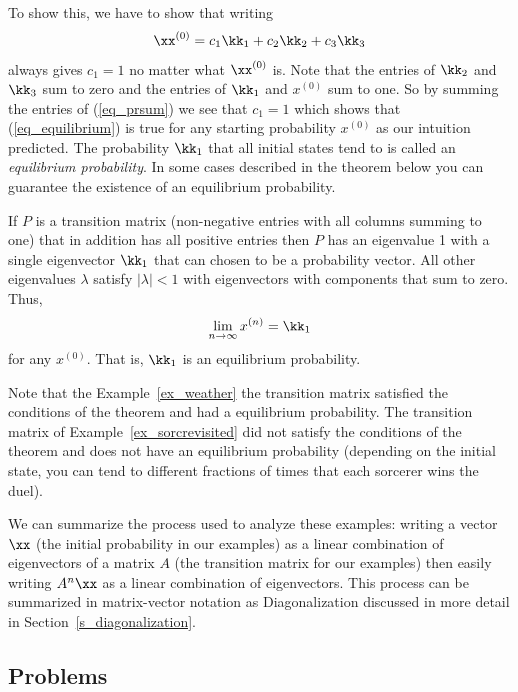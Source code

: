 To show this, we have to show that writing 
\begin{equation}
\label{eq_prsum}
\xx^{(0)} = c_1 \kk_1 + c_2 \kk_2 + c_3 \kk_3
\end{equation} 
always gives $c_1 =1$ no matter what $\xx^{(0)}$ is. Note that the entries 
of $\kk_2$ and $\kk_3$ sum to zero and the entries of $\kk_1$ and $x^{(0)}$ 
sum to one. So by summing the entries of (\ref{eq_prsum}) we see that 
$c_1 = 1$ which shows that (\ref{eq_equilibrium}) is true for 
any starting probability $x^{(0)}$ as our intuition predicted. 
The probability $\kk_1$ that all initial states tend to is called an 
{\em equilibrium probability}. In some cases described in the theorem 
below you can guarantee the existence of an equilibrium probability. 

\begin{theorem}
\label{thm:eq_probability}
If $P$ is a transition matrix (non-negative entries with
all columns summing to one) that in addition has all positive entries 
then $P$ has an eigenvalue 1 with a single eigenvector $\kk_1$ that can 
chosen to be a probability vector. All other eigenvalues $\lambda$ 
satisfy $|\lambda|<1$ with eigenvectors with components that sum to 
zero. Thus, 
\[
\lim_{n \rightarrow \infty} x^{(n)} = \kk_1
\]
for any $x^{(0)}$. That is, $\kk_1$ is an equilibrium probability. 
\end{theorem} 

Note that the Example~\ref{ex_weather} the transition matrix satisfied the 
conditions of the theorem and had a equilibrium probability.
The transition matrix of Example~\ref{ex_sorcrevisited} did not 
satisfy the conditions of the theorem and does not have an 
equilibrium probability (depending on the initial state, you can tend 
to different fractions of times that each sorcerer wins the duel). 

We can summarize the process used to analyze these examples: 
writing a vector $\xx$ 
(the initial probability in our examples) 
as a linear combination of eigenvectors of a matrix $A$ (the 
transition matrix for our examples) then easily writing 
$A^n \xx$ as a linear combination of eigenvectors. This process 
can be summarized in matrix-vector notation as Diagonalization discussed 
in more detail in Section~\ref{s_diagonalization}.

\subsection{Problems}

